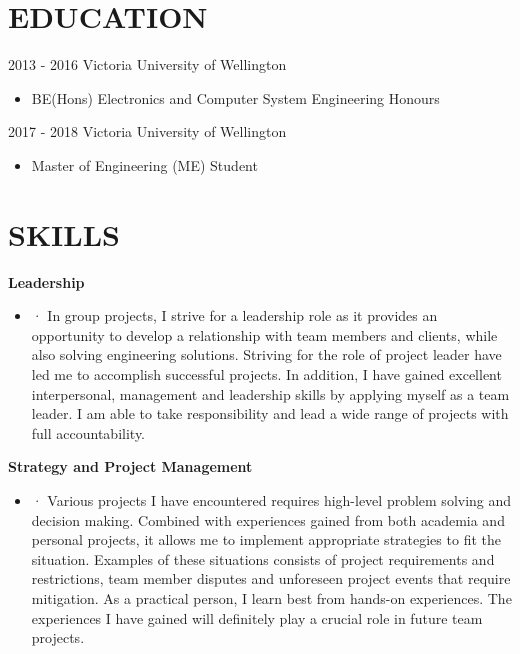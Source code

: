 \documentclass[3pt]{res}
\begin{document}
 
\thispagestyle{empty} %
\address{46 Furlong Crescent\\
Churton Park, Wellington 6037\\
+64 0210705328\\
andrewang321@gmail.com}


\begin{resume}

\section{EDUCATION}
\vspace{0.1in} 
	 
     2013 - 2016 Victoria University of Wellington
    	\begin{itemize} %
      \item[] BE(Hons) Electronics and Computer System Engineering Honours
      \end{itemize}
     
     2017 - 2018 Victoria University of Wellington
     	\begin{itemize}
     	\item Master of Engineering (ME) Student
     	\end{itemize}
 
\section{SKILLS} 
\vspace{0.1in}
  {\bf Leadership}
    \begin{itemize} %
      \item[] ·	In group projects, I strive for a leadership role as it provides an opportunity to develop a relationship with team members and clients, while also solving engineering solutions. Striving for the role of project leader have led me to accomplish successful projects. In addition, I have gained excellent interpersonal, management and leadership skills by applying myself as a team leader. I am able to take responsibility and lead a wide range of projects with full accountability.
      \end{itemize}

{\bf Strategy and Project Management} 
       \begin{itemize}
        \item[] ·	Various projects I have encountered requires high-level problem solving and decision making. Combined with experiences gained from both academia and personal projects, it allows me to implement appropriate strategies to fit the situation. Examples of these situations consists of project requirements and restrictions, team member disputes and unforeseen project events that require mitigation. As a practical person, I learn best from hands-on experiences. The experiences I have gained will definitely play a crucial role in future team projects.
    \end{itemize}


\end{resume}
\end{document}
